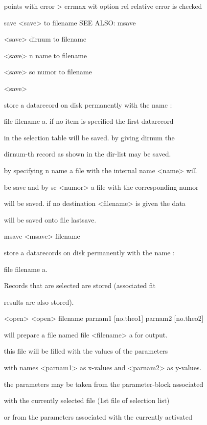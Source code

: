 \documentclass[]{article}
\begin{document}
points with error \textgreater{} errmax wit option rel relative error is
checked

save \textless{}save\textgreater{} to filename SEE ALSO: msave

\textless{}save\textgreater{} dirnum to filename

\textless{}save\textgreater{} n name to filename

\textless{}save\textgreater{} sc numor to filename

\textless{}save\textgreater{}

store a datarecord on disk permanently with the name :

file filename a. if no item is specified the first datarecord

in the selection table will be saved. by giving dirnum the

dirnum-th record as shown in the dir-list may be saved.

by specifying n name a file with the internal name
\textless{}name\textgreater{} will

be save and by sc \textless{}numor\textgreater{} a file with the
corresponding numor

will be saved. if no destination \textless{}filename\textgreater{} is
given the data

will be saved onto file lastsave.

msave \textless{}msave\textgreater{} filename

store a datarecords on disk permanently with the name :

file filename a.

Records that are selected are stored (associated fit

results are also stored).

\textless{}open\textgreater{} \textless{}open\textgreater{} filename
parnam1 {[}no.theo1{]} parnam2 {[}no.theo2{]}

will prepare a file named file \textless{}filename\textgreater{} a for
output.

this file will be filled with the values of the parameters

with names \textless{}parnam1\textgreater{} as x-values and
\textless{}parnam2\textgreater{} as y-values.

the parameters may be taken from the parameter-block associated

with the currently selected file (1st file of selection list)

or from the parameters associated with the currently activated
\end{document}
